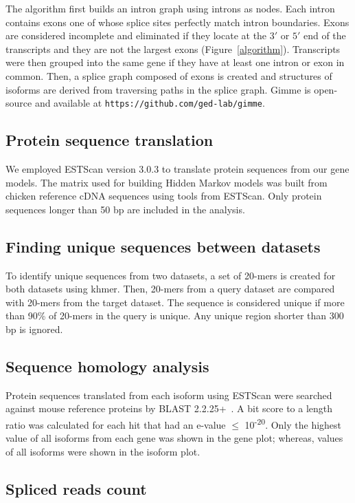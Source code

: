 The algorithm first builds an intron graph using introns as nodes.  Each intron
contains exons one of whose splice sites perfectly match intron boundaries.
Exons are considered incomplete and eliminated if they locate at the $3'$ or
$5'$ end of the transcripts and they are not the largest exons
(Figure~\ref{algorithm}).  Transcripts were then grouped into the same gene if
they have at least one intron or exon in common.  Then, a splice graph composed
of exons is created and structures of isoforms are derived from traversing
paths in the splice graph.  Gimme is open-source and available at
\texttt{https://github.com/ged-lab/gimme}.

\subsection{Protein sequence translation}

We employed ESTScan version 3.0.3 to translate protein sequences from our gene
models.  The matrix used for building Hidden Markov models was built from chicken
reference cDNA sequences using tools from ESTScan. Only protein sequences longer
than 50 bp are included in the analysis.

\subsection{Finding unique sequences between datasets}

To identify unique sequences from two datasets, a set of 20-mers is created for
both datasets using khmer.  Then, 20-mers from a query dataset are
compared with 20-mers from the target dataset.  The sequence is considered
unique if more than 90\% of 20-mers in the query is unique.  Any unique region
shorter than 300 bp is ignored.

\subsection{Sequence homology analysis}

Protein sequences translated from each isoform using ESTScan were searched
against mouse reference proteins by BLAST 2.2.25+~\cite{Tatusova:1999tz}.  A bit
score to a length ratio was calculated for each hit that had an e-value $\le$
10\textsuperscript{-20}.  Only the highest value of all isoforms from each gene
was shown in the gene plot; whereas, values of all isoforms were shown in the
isoform plot.

\subsection{Spliced reads count}


